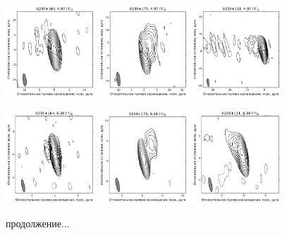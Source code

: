 \begin{figure}
  \includegraphics[width=0.3\textwidth]{0235+164_C.pdf}
  \includegraphics[width=0.3\textwidth]{0239+175_C.pdf}
  \includegraphics[width=0.3\textwidth]{0229+131_C.pdf}


  \includegraphics[width=0.3\textwidth]{0235+164_X.pdf}
  \includegraphics[width=0.3\textwidth]{0239+175_X.pdf}
  \includegraphics[width=0.3\textwidth]{0229+131_X.pdf}

  \caption{продолжение...}
\end{figure}

